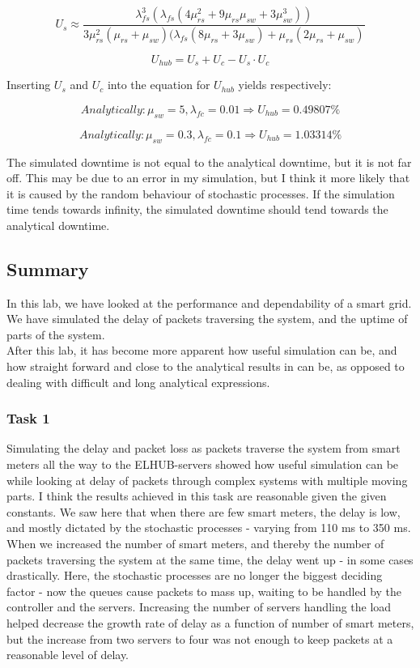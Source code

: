 \documentclass[11pt]{article}
\begin{document}
$$U_s \approx \frac{\lambda_{fs}^3(\lambda_{fs}(4\mu_{rs}^2 + 9\mu_{rs}\mu_{sw} + 3\mu_{sw}^3))}{3\mu_{rs}^2(\mu_{rs}+\mu_{sw})(\lambda_{fs}(8\mu_{rs} + 3\mu_{sw}) + \mu_{rs}(2\mu_{rs}+\mu_{sw})} $$

$$U_{hub} = U_s + U_c - U_s \cdot U_c$$

Inserting $U_s$ and $U_c$ into the equation for $U_{hub}$ yields respectively:

$$Analytically: \mu_{sw} = 5, \lambda_{fc} = 0.01 \Rightarrow U_{hub} = 0.49807\%$$

$$Analytically: \mu_{sw} = 0.3, \lambda_{fc} = 0.1 \Rightarrow U_{hub} = 1.03314\%$$

The simulated downtime is not equal to the analytical downtime, but it is not far off. This may be due to an error in my simulation, but I think it more likely that it is caused by the random behaviour of stochastic processes. If the simulation time tends towards infinity, the simulated downtime should tend towards the analytical downtime.




\newpage
\subsection{Summary}

In this lab, we have looked at the performance and dependability of a smart grid. We have simulated the delay of packets traversing the system, and the uptime of parts of the system.\\

After this lab, it has become more apparent how useful simulation can be, and how straight forward and close to the analytical results in can be, as opposed to dealing with difficult and long analytical expressions.

\subsubsection{Task 1}
Simulating the delay and packet loss as packets traverse the system from smart meters all the way to the ELHUB-servers showed how useful simulation can be while looking at delay of packets through complex systems with multiple moving parts. I think the results achieved in this task are reasonable given the given constants. We saw here that when there are few smart meters, the delay is low, and mostly dictated by the stochastic processes - varying from 110 ms to 350 ms. When we increased the number of smart meters, and thereby the number of packets traversing the system at the same time, the delay went up - in some cases drastically. Here, the stochastic processes are no longer the biggest deciding factor - now the queues cause packets to mass up, waiting to be handled by the controller and the servers. Increasing the number of servers handling the load helped decrease the growth rate of delay as a function of number of smart meters, but the increase from two servers to four was not enough to keep packets at a reasonable level of delay.
\end{document}
